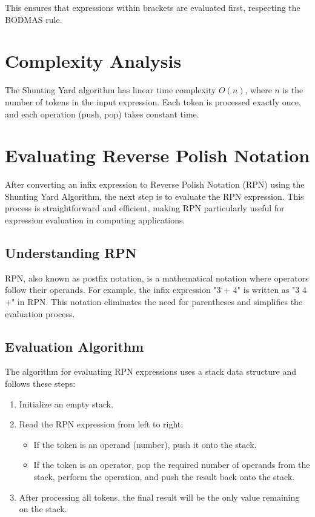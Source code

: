 \documentclass[a4paper,12pt]{article}
\begin{document}
This ensures that expressions within brackets are evaluated first, respecting the BODMAS rule.

\section{Complexity Analysis}

The Shunting Yard algorithm has linear time complexity $O(n)$, where $n$ is the number of tokens in the input expression. Each token is processed exactly once, and each operation (push, pop) takes constant time.

\section{Evaluating Reverse Polish Notation}

After converting an infix expression to Reverse Polish Notation (RPN) using the Shunting Yard Algorithm, the next step is to evaluate the RPN expression. This process is straightforward and efficient, making RPN particularly useful for expression evaluation in computing applications.

\subsection{Understanding RPN}

RPN, also known as postfix notation, is a mathematical notation where operators follow their operands. For example, the infix expression "3 + 4" is written as "3 4 +" in RPN. This notation eliminates the need for parentheses and simplifies the evaluation process.

\subsection{Evaluation Algorithm}

The algorithm for evaluating RPN expressions uses a stack data structure and follows these steps:

\begin{enumerate}
\item Initialize an empty stack.
\item Read the RPN expression from left to right:
\begin{itemize}
\item If the token is an operand (number), push it onto the stack.
\item If the token is an operator, pop the required number of operands from the stack, perform the operation, and push the result back onto the stack.
\end{itemize}
\item After processing all tokens, the final result will be the only value remaining on the stack.
\end{enumerate}
\end{document}
